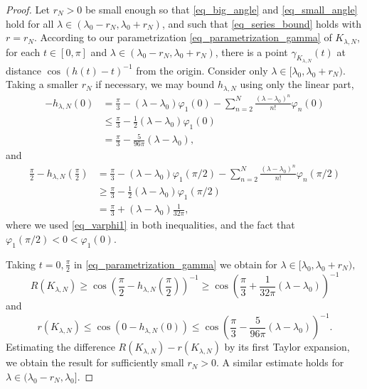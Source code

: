 \documentclass[10pt,a4paper]{amsart}
\begin{document}
\begin{proof}
	Let $r_N>0$ be small enough so that \eqref{eq_big_angle} and \eqref{eq_small_angle} hold for all $\lambda \in (\lambda_0-r_N,\lambda_0+ r_N)$, and such that \eqref{eq_series_bound} holds with $r = r_N$.
	According to our parametrization \eqref{eq_parametrization_gamma} of $K_{\lambda,N}$, for each $t \in [0,\pi]$ and $\lambda \in (\lambda_0-r_N, \lambda_0 + r_N)$, there is a point $\gamma_{K_{\lambda,N}}(t)$ at distance $\cos(h(t)-t)^{-1}$ from the origin.
	Consider only $\lambda \in [\lambda_0, \lambda_0 + r_N)$. Taking a smaller $r_N$ if necessary, we may bound $h_{\lambda,N}$ using only the linear part,
	\begin{align}
		\label{eq_big_angle}
		-h_{\lambda,N}(0) &= \frac \pi 3 - (\lambda-\lambda_0) \varphi_1(0) - \sum_{n=2}^N \frac {(\lambda-\lambda_0)^n}{n!} \varphi_n(0)\\
		&\leq \frac \pi 3 - \frac 12 (\lambda-\lambda_0) \varphi_1(0)\\
		&= \frac \pi 3 - \frac 5{96 \pi} (\lambda-\lambda_0),
	\end{align}
	and
	\begin{align}
		\label{eq_small_angle}
	\frac \pi 2 - h_{\lambda,N}\left(\frac \pi 2\right)
		&= \frac \pi 3 - (\lambda-\lambda_0) \varphi_1(\pi/2) - \sum_{n=2}^N \frac {(\lambda-\lambda_0)^n}{n!} \varphi_n(\pi/2)\\
		&\geq \frac \pi 3 - \frac 12 (\lambda-\lambda_0) \varphi_1(\pi/2)\\
		&= \frac \pi 3 + (\lambda-\lambda_0) \frac 1{32 \pi},
	\end{align}
	where we used \eqref{eq_varphi1} in both inequalities, and the fact that $\varphi_1(\pi/2) < 0 < \varphi_1(0)$.

	Taking $t = 0, \frac \pi 2$ in \eqref{eq_parametrization_gamma} we obtain for $\lambda \in [\lambda_0, \lambda_0 + r_N),$
	\[R(K_{\lambda,N}) \geq \cos\left(\frac \pi 2 - h_{\lambda,N}\left(\frac \pi 2\right)\right)^{-1} \geq \cos(\frac \pi 3 + \frac 1{32 \pi} (\lambda-\lambda_0))^{-1} \]
	and
	\[r(K_{\lambda,N}) \leq \cos(0 - h_{\lambda,N}(0)) \leq \cos(\frac \pi 3 - \frac 5{96 \pi} (\lambda-\lambda_0))^{-1}.\]
	Estimating the difference $R(K_{\lambda,N}) - r(K_{\lambda,N})$ by its first Taylor expansion, we obtain the result for sufficiently small  $r_N>0$.
	A similar estimate holds for $\lambda \in (\lambda_0 - r_N,\lambda_0]$.
\end{proof}
\end{document}
